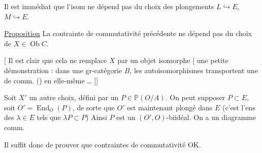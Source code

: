 
Il est immédiat que 
l'isom ne dépend pas du choix des plongements $L\hookrightarrow E$,
$M\hookrightarrow E$.

\uline{Proposition} La contrainte de commutativité précédente ne dépend
pas du choix de $X\in\operatorname{Ob}C$.

[
Il est clair que cela ne 
remplace $X$ par un objet isomorphe
[ une petite démonstration : dans une gr-catégorie
$B$, les  autoisomorphismes
 transportent une
de comm. () en elle-même \ldots
]]

Soit $X'$ un autre choix, défini par un $P\in\mathbb P(O/A)$.
On peut supposer $P\subset E$, soit $O'=\operatorname{End}_O(P)$,
de sorte que $O'$ est maintenant plongé dans $E$
(c'est l'ens des  $\lambda\in E$ tels que
$\lambda P\subset P$) Ainsi $P$ est un 
$(O',O)$-biidéal. On a un diagramme comm.


Il suffit donc de prouver que 
contraintes de commutativité
OK.
